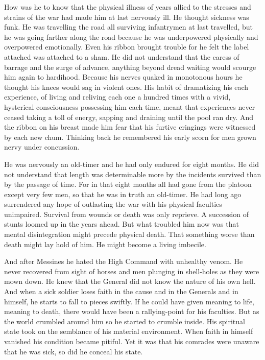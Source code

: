 How was he to know that the physical illness of years allied to the stresses and strains of the war had made him at last nervously ill. He thought sickness was funk. He was travelling the road all surviving infantrymen at last travelled, but he was going farther along the road because he was underpowered physically and overpowered emotionally. Even his ribbon brought trouble for he felt the label attached was attached to a sham. He did not understand that the caress of barrage and the surge of advance, anything beyond dread waiting would scourge him again to hardihood. Because his nerves quaked in monotonous hours he thought his knees would sag in violent ones. His habit of dramatizing his each experience, of living and reliving each one a hundred times with a vivid, hysterical consciousness possessing him each time, meant that experiences never ceased taking a toll of energy, sapping and draining until the pool ran dry. And the ribbon on his breast made him fear that his furtive cringings were witnessed by each new chum. Thinking back he remembered his early scorn for men grown nervy under concussion.

He was nervously an old-timer and he had only endured for eight months. He did not understand that length was determinable more by the incidents survived than by the passage of time. For in that eight months all had gone from the platoon except very few men, so that he was in truth an old-timer. He had long ago surrendered any hope of outlasting the war with his physical faculties unimpaired. Survival from wounds or death was only reprieve. A succession of stunts loomed up in the years ahead. But what troubled him now was that mental disintegration might precede physical death. That something worse than death might lay hold of him. He might become a living imbecile.

And after Messines he hated the High Command with unhealthy venom. He never recovered from sight of horses and men plunging in shell-holes as they were mown down. He knew that the General did not know the nature of his own hell. And when a sick soldier loses faith in the cause and in the Generals and in himself, he starts to fall to pieces swiftly. If he could have given meaning to life, meaning to death, there would have been a rallying-point for his faculties. But as the world crumbled around him so he started to crumble inside. His spiritual state took on the semblance of his material environment. When faith in himself vanished his condition became pitiful. Yet it was that his comrades were unaware that he was sick, so did he conceal his state.


